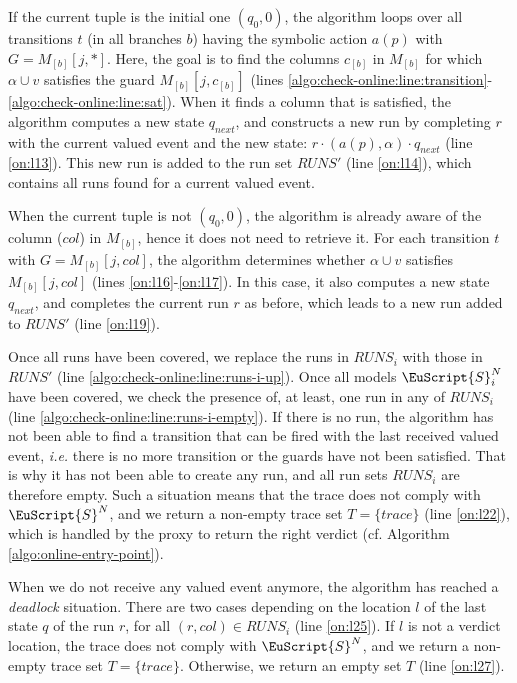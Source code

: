 If the current tuple is the initial one $(q_0, 0)$,
the algorithm loops over all transitions $t$ (in all branches
$b$) having the symbolic action $a(p)$ with $G = M_{[b]}[j, *]$.
Here, the goal is to find the columns $c_{[b]}$ in $M_{[b]}$ for
which $\alpha \cup v$ satisfies the guard $M_{[b]}[j, c_{[b]}]$
(lines
\ref{algo:check-online:line:transition}-\ref{algo:check-online:line:sat}).
When it finds a column that is satisfied, the algorithm computes
a new state $q_{next}$, and constructs a new run by completing
$r$ with the current valued event and the new state: $r \cdot
(a(p), \alpha) \cdot q_{next}$ (line \ref{on:l13}). This new run is added
to the run set $RUNS'$ (line \ref{on:l14}), which contains all runs found
for a current valued event.

When the current tuple is not $(q_0, 0)$, the algorithm is
already aware of the column ($col$) in $M_{[b]}$, hence it does not
need to retrieve it. For each transition $t$ with $G = M_{[b]}[j,
col]$, the algorithm determines whether $\alpha \cup v$ satisfies
$M_{[b]}[j, col]$ (lines \ref{on:l16}-\ref{on:l17}).
In this case, it also computes a new state $q_{next}$, and
completes the current run $r$ as before, which leads to a new
run added to $RUNS'$ (line \ref{on:l19}).

Once all runs have been covered, we replace the runs in  $RUNS_i$
with those in $RUNS'$ (line
\ref{algo:check-online:line:runs-i-up}). Once all models
$\EuScript{S}_i^N$ have been covered, we check the presence
of, at least, one run in any of $RUNS_i$ (line
\ref{algo:check-online:line:runs-i-empty}). If there is no run,
the algorithm has not been able to find a transition that can be
fired with the last received valued event, \emph{i.e.} there is
no more transition or the guards have not been satisfied. That is
why it has not been able to create any run, and all run sets
$RUNS_i$ are therefore empty. Such a situation means that the
trace does not comply with $\EuScript{S}^N$, and we return a
non-empty trace set $T = \{ trace \}$ (line \ref{on:l22}), which
is handled by the proxy to return the right verdict (cf.
Algorithm \ref{algo:online-entry-point}).

When we do not receive any valued event anymore, the algorithm
has reached a \emph{deadlock} situation. There are two cases
depending on the location $l$ of the last state $q$ of the run
$r$, for all $(r, col) \in RUNS_i$ (line \ref{on:l25}).
If $l$ is not a verdict location, the trace does not
comply with  $\EuScript{S}^N$, and we return a non-empty trace
set $T = \{ trace \}$.  Otherwise, we return an empty set $T$
(line \ref{on:l27}).

